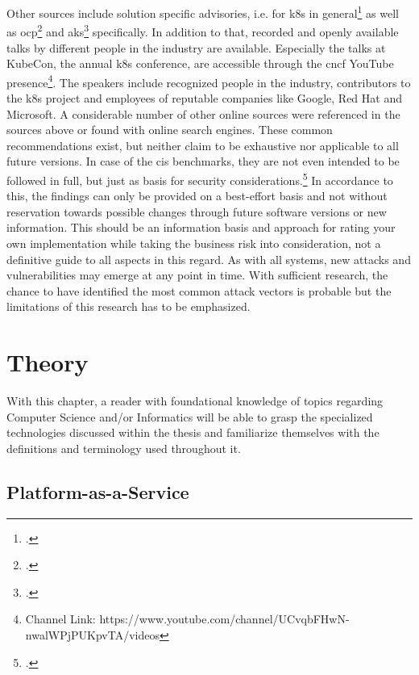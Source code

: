 Other sources include solution specific advisories, i.e. for \gls{k8s} in general\footcite{k8sDocsSecurity} as well as \gls{ocp}\footcite{ocpSecTips} and \gls{aks}\footcite{aksSecTips} specifically. In addition to that, recorded and openly available talks by different people in the industry are available. Especially the talks at KubeCon, the annual \gls{k8s} conference, are accessible through the \gls{cncf} YouTube presence\footnote{Channel Link: https://www.youtube.com/channel/UCvqbFHwN-nwalWPjPUKpvTA/videos}. The speakers include recognized people in the industry, contributors to the \gls{k8s} project and employees of reputable companies like Google, Red Hat and Microsoft.
A considerable number of other online sources were referenced in the sources above or found with online search engines.
These common recommendations exist, but neither claim to be exhaustive nor applicable to all future versions. In case of the \gls{cis} benchmarks, they are not even intended to be followed in full, but just as basis for security considerations.\footcite[][, starting at 29:18]{cisJustRecommendation}
In accordance to this, the findings can only be provided on a best-effort basis and not without reservation towards possible changes through future software versions or new information. This should be an information basis and approach for rating your own implementation while taking the business risk into consideration, not a definitive guide to all aspects in this regard.
As with all systems, new attacks and vulnerabilities may emerge at any point in time. With sufficient research, the chance to have identified the most common attack vectors is probable but the limitations of this research has to be emphasized.


\chapter{Theory}
With this chapter, a reader with foundational knowledge of topics regarding Computer Science and/or Informatics 
will be able to grasp the specialized technologies discussed within the thesis and familiarize themselves with the definitions and terminology used throughout it.

\section{Platform-as-a-Service}

